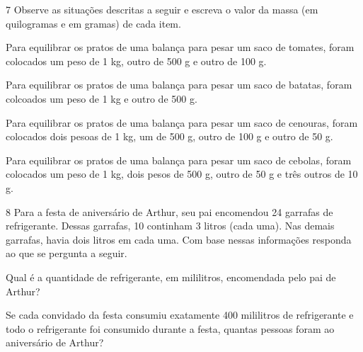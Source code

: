 
\num{7} Observe as situações descritas a seguir e escreva o valor da massa (em quilogramas e em gramas) de cada item.

\begin{escolha}
\item
  Para equilibrar os pratos de uma balança para pesar um saco de tomates, foram colocados um peso de 1 kg, outro de 500 g e outro de 100 g.


\item
  Para equilibrar os pratos de uma balança para pesar um saco de batatas, foram colcoados um peso de 1 kg e outro de 500 g.


\item
  Para equilibrar os pratos de uma balança para pesar um saco de cenouras, foram colocados dois pesoas de 1 kg, um de 500 g, outro de 100 g e outro de 50 g.


\item
  Para equilibrar os pratos de uma balança para pesar um saco de cebolas, foram colocados um peso de 1 kg, dois pesos de 500 g, outro de 50 g e três outros de 10 g.

\end{escolha}

\num{8} Para a festa de aniversário de Arthur, seu pai encomendou 24 garrafas de
refrigerante. Dessas garrafas, 10 continham 3 litros (cada uma). Nas
demais garrafas, havia dois litros em cada uma. Com base nessas
informações responda ao que se pergunta a seguir.

\begin{escolha}
\item
  Qual é a quantidade de refrigerante, em mililitros, encomendada pelo pai de Arthur?


\item
  Se cada convidado da festa consumiu exatamente 400 mililitros de refrigerante e
  todo o refrigerante foi consumido durante a festa, quantas pessoas
  foram ao aniversário de Arthur?

\end{escolha}

